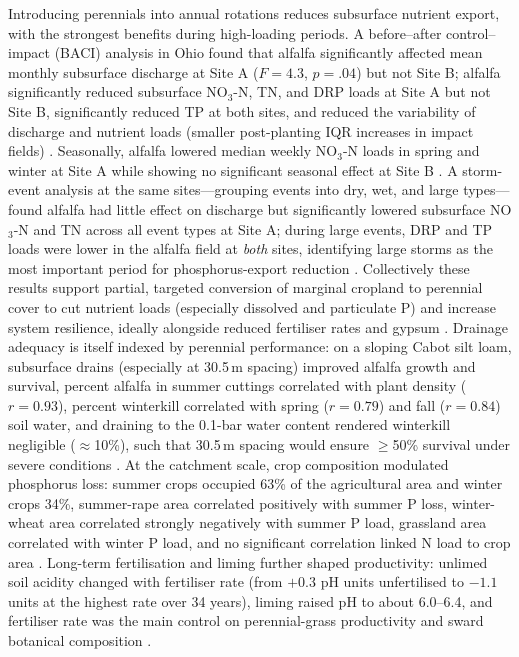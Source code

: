 \documentclass[11pt]{article}
\begin{document}
Introducing perennials into annual rotations reduces subsurface nutrient export, with the strongest benefits during high-loading periods. A before--after control--impact (BACI) analysis in Ohio found that alfalfa significantly affected mean monthly subsurface discharge at Site A ($F=4.3$, $p=.04$) but not Site B; alfalfa significantly reduced subsurface NO$_3$-N, TN, and DRP loads at Site A but not Site B, significantly reduced TP at both sites, and reduced the variability of discharge and nutrient loads (smaller post-planting IQR increases in impact fields) \parencite{Arrueta2022}. Seasonally, alfalfa lowered median weekly NO$_3$-N loads in spring and winter at Site A while showing no significant seasonal effect at Site B \parencite{Arrueta2022}. A storm-event analysis at the same sites---grouping events into dry, wet, and large types---found alfalfa had little effect on discharge but significantly lowered subsurface NO$_3$-N and TN across all event types at Site A; during large events, DRP and TP loads were lower in the alfalfa field at \emph{both} sites, identifying large storms as the most important period for phosphorus-export reduction \parencite{Arrueta2025}. Collectively these results support partial, targeted conversion of marginal cropland to perennial cover to cut nutrient loads (especially dissolved and particulate P) and increase system resilience, ideally alongside reduced fertiliser rates and gypsum \parencite{Arrueta2022,Arrueta2025}. Drainage adequacy is itself indexed by perennial performance: on a sloping Cabot silt loam, subsurface drains (especially at 30.5\,m spacing) improved alfalfa growth and survival, percent alfalfa in summer cuttings correlated with plant density ($r=0.93$), percent winterkill correlated with spring ($r=0.79$) and fall ($r=0.84$) soil water, and draining to the 0.1-bar water content rendered winterkill negligible ($\approx$10\%), such that 30.5\,m spacing would ensure $\geq$50\% survival under severe conditions \parencite{BENOIT1967}. At the catchment scale, crop composition modulated phosphorus loss: summer crops occupied 63\% of the agricultural area and winter crops 34\%, summer-rape area correlated positively with summer P loss, winter-wheat area correlated strongly negatively with summer P load, grassland area correlated with winter P load, and no significant correlation linked N load to crop area \parencite{DambenieceMigliniece2018}. Long-term fertilisation and liming further shaped productivity: unlimed soil acidity changed with fertiliser rate (from $+0.3$ pH units unfertilised to $-1.1$ units at the highest rate over 34 years), liming raised pH to about 6.0--6.4, and fertiliser rate was the main control on perennial-grass productivity and sward botanical composition \parencite{Vigovskis2016}.
\end{document}
